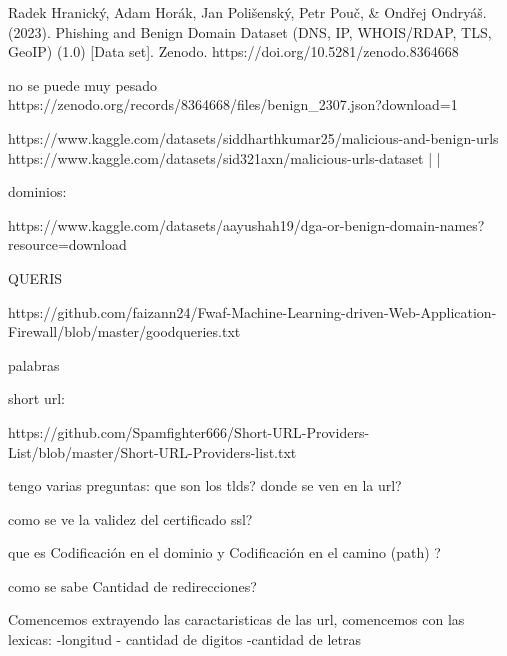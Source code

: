 Radek Hranický, Adam Horák, Jan Polišenský, Petr Pouč, & Ondřej Ondryáš. (2023). Phishing and Benign Domain Dataset (DNS, IP, WHOIS/RDAP, TLS, GeoIP) (1.0) [Data set]. Zenodo. https://doi.org/10.5281/zenodo.8364668

no se puede muy pesado
https://zenodo.org/records/8364668/files/benign_2307.json?download=1




https://www.kaggle.com/datasets/siddharthkumar25/malicious-and-benign-urls
https://www.kaggle.com/datasets/sid321axn/malicious-urls-dataset
|
|




dominios:

https://www.kaggle.com/datasets/aayushah19/dga-or-benign-domain-names?resource=download


QUERIS

https://github.com/faizann24/Fwaf-Machine-Learning-driven-Web-Application-Firewall/blob/master/goodqueries.txt




palabras



short url:

https://github.com/Spamfighter666/Short-URL-Providers-List/blob/master/Short-URL-Providers-list.txt






tengo varias preguntas: que son los tlds? donde se ven en la url?

como se ve la validez del certificado ssl?

que es Codificación en el dominio y Codificación en el camino (path) ?

como se sabe Cantidad de redirecciones?


Comencemos extrayendo las caractaristicas de las url, comencemos con las lexicas:
-longitud
- cantidad de digitos
-cantidad de letras
